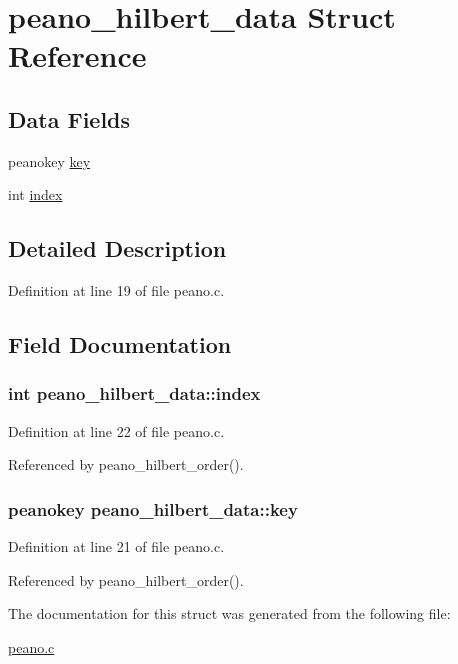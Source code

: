 \hypertarget{structpeano__hilbert__data}{\section{peano\-\_\-hilbert\-\_\-data \-Struct \-Reference}
\label{structpeano__hilbert__data}
}
\subsection*{\-Data \-Fields}
\begin{DoxyCompactItemize}
\item 
peanokey \hyperlink{structpeano__hilbert__data_aaa704e82d9ca3b022e83cb23fe715131}{key}
\item 
int \hyperlink{structpeano__hilbert__data_a37ba0b5554835eecd76473f5cd02f257}{index}
\end{DoxyCompactItemize}


\subsection{\-Detailed \-Description}


\-Definition at line 19 of file peano.\-c.



\subsection{\-Field \-Documentation}
\hypertarget{structpeano__hilbert__data_a37ba0b5554835eecd76473f5cd02f257}{
\subsubsection[{index}]{\setlength{\rightskip}{0pt plus 5cm}int {\bf peano\-\_\-hilbert\-\_\-data\-::index}}}\label{structpeano__hilbert__data_a37ba0b5554835eecd76473f5cd02f257}


\-Definition at line 22 of file peano.\-c.



\-Referenced by peano\-\_\-hilbert\-\_\-order().

\hypertarget{structpeano__hilbert__data_aaa704e82d9ca3b022e83cb23fe715131}{
\subsubsection[{key}]{\setlength{\rightskip}{0pt plus 5cm}peanokey {\bf peano\-\_\-hilbert\-\_\-data\-::key}}}\label{structpeano__hilbert__data_aaa704e82d9ca3b022e83cb23fe715131}


\-Definition at line 21 of file peano.\-c.



\-Referenced by peano\-\_\-hilbert\-\_\-order().



\-The documentation for this struct was generated from the following file\-:\begin{DoxyCompactItemize}
\item 
\hyperlink{peano_8c}{peano.\-c}\end{DoxyCompactItemize}
